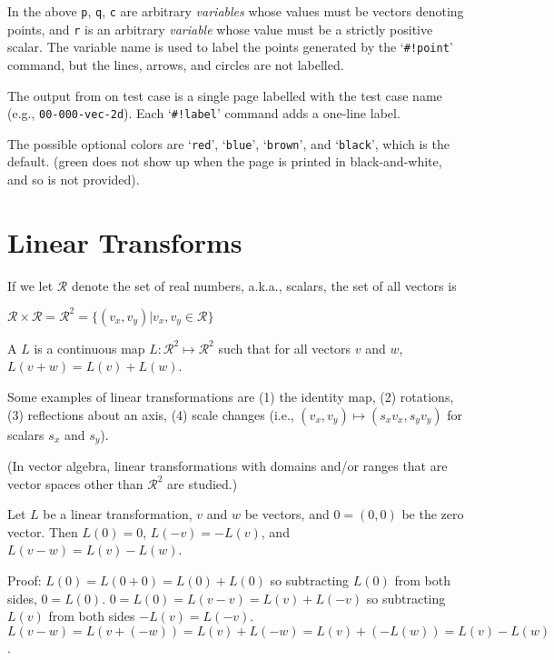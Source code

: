 \documentclass[12pt]{article}
\begin{document}
In the above {\tt p}, {\tt q}, {\tt c} are arbitrary {\em variables} whose
values must be vectors denoting points, and {\tt r} is an arbitrary
{\em variable} whose value must be a strictly positive scalar.
The variable name is used
to label the points generated by the `{\tt \#!point}' command, but
the lines, arrows, and circles  are not labelled.

The output from on test case
is a single page labelled with the test case name (e.g., {\tt 00-000-vec-2d}).
Each `{\tt \#!label}' command adds a one-line label.

The possible
optional colors
are `{\tt red}', `{\tt blue}', `{\tt brown}', and `{\tt black}', which is
the default.
(green does not show up when the page is printed in black-and-white, and
so is not provided).

\newpage

\section{Linear Transforms}
If we let $\mathcal{R}$ denote the set of real numbers,
a.k.a., scalars, the set of all vectors is \\
\centerline{
$\mathcal{R}\times\mathcal{R}=\mathcal{R}^2
    =\{(v_x,v_y)|v_x,v_y\in \mathcal{R}\}$}

\begin{definition}\label{LINEAR-TRANSFORMATION}
A  $L$ is a continuous map
$L:\mathcal{R}^2\mapsto\mathcal{R}^2$ such that for
all vectors $v$ and $w$, $L(v+w)=L(v)+L(w)$.
\end{definition}

Some examples of linear transformations are (1) the identity map,
(2) rotations, (3) reflections about an axis, (4) scale changes
(i.e., $(v_x,v_y)\longmapsto(s_x v_x,s_y v_y)$ for scalars $s_x$
and $s_y$).

(In vector algebra, linear transformations with domains and/or ranges
that are vector spaces other than $\mathcal{R}^2$ are studied.)


\begin{lemma}
Let $L$ be a linear transformation, $v$ and $w$ be vectors,
and $0=(0,0)$ be the zero vector.  Then $L(0)=0$,  $L(-v)=-L(v)$,
and $L(v-w) = L(v) - L(w)$.
\end{lemma}
\begin{indpar}{0.5in}
Proof: $L(0) = L(0+0)= L(0) + L(0)$ so subtracting $L(0)$
from both sides, $0=L(0)$.  $0 = L(0) = L(v-v) = L(v) + L(-v)$
so subtracting $L(v)$ from both sides $-L(v)=L(-v)$.
$L(v-w)=L(v+(-w))=L(v)+L(-w)=L(v)+(-L(w))=L(v)-L(w)$.
\end{indpar}
\end{document}
